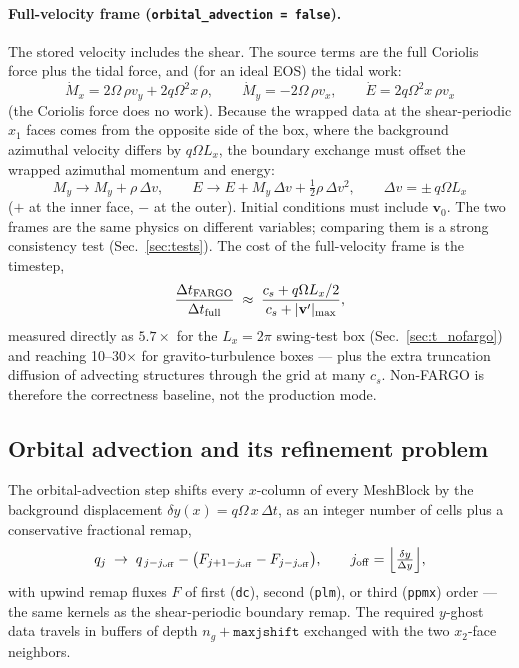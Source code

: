 \documentclass[11pt]{article}
\newcommand{\code}[1]{\texttt{#1}}
\begin{document}
\paragraph{Full-velocity frame (\code{orbital\_advection = false}).} The stored
velocity includes the shear. The source terms are the full Coriolis force plus the
tidal force, and (for an ideal EOS) the tidal work:
\begin{equation}
  \dot M_x = 2\Omega\,\rho v_y + 2q\Omega^2 x\,\rho, \qquad
  \dot M_y = -2\Omega\,\rho v_x, \qquad
  \dot E = 2q\Omega^2 x\,\rho v_x
  \label{eq:nofargo_src}
\end{equation}
(the Coriolis force does no work). Because the wrapped data at the shear-periodic
$x_1$ faces comes from the opposite side of the box, where the background azimuthal
velocity differs by $q\Omega L_x$, the boundary exchange must offset the wrapped
azimuthal momentum and energy:
\begin{equation}
  M_y \to M_y + \rho\,\Delta v, \qquad
  E \to E + M_y\,\Delta v + \tfrac12\rho\,\Delta v^2, \qquad
  \Delta v = \pm\, q\Omega L_x
  \label{eq:bc_offset}
\end{equation}
($+$ at the inner face, $-$ at the outer). Initial conditions must include
$\mathbf{v}_0$. The two frames are the same physics on different variables; comparing
them is a strong consistency test (Sec.~\ref{sec:tests}). The cost of the
full-velocity frame is the timestep,
\begin{equation}
  \frac{\Delta t_{\rm FARGO}}{\Delta t_{\rm full}}
  \;\approx\; \frac{c_s + q\Omega L_x/2}{c_s + |\mathbf{v}'|_{\max}} ,
  \label{eq:dtcost}
\end{equation}
measured directly as $5.7\times$ for the $L_x = 2\pi$ swing-test box
(Sec.~\ref{sec:t_nofargo}) and reaching 10--30$\times$ for gravito-turbulence boxes
--- plus the extra truncation diffusion of advecting structures through the grid at
many $c_s$. Non-FARGO is therefore the correctness baseline, not the production mode.

\subsection{Orbital advection and its refinement problem}
\label{sec:oa}
The orbital-advection step shifts every $x$-column of every MeshBlock by the
background displacement $\delta y(x) = q\Omega\,x\,\Delta t$, as an integer number of
cells plus a conservative fractional remap,
\begin{equation}
  q_j \;\to\; q_{\,j - j_{\rm off}} - \bigl(F_{j+1-j_{\rm off}} - F_{j-j_{\rm off}}\bigr),
  \qquad j_{\rm off} = \Bigl\lfloor \tfrac{\delta y}{\Delta y} \Bigr\rfloor,
\end{equation}
with upwind remap fluxes $F$ of first (\code{dc}), second (\code{plm}), or third
(\code{ppmx}) order --- the same kernels as the shear-periodic boundary remap. The
required $y$-ghost data travels in buffers of depth $n_g + \code{maxjshift}$ exchanged
with the two $x_2$-face neighbors.
\end{document}
